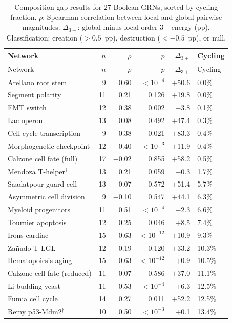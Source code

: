 \documentclass[10pt]{article}
\begin{document}
\begin{longtable}{lrrrrl}
\caption{Composition gap results for 27 Boolean GRNs, sorted by
cycling fraction. $\rho$: Spearman correlation between local and
global pairwise magnitudes. $\Delta_{3+}$: global minus local
order-3+ energy (pp). Classification: creation ($> 0.5$~pp),
destruction ($< -0.5$~pp), or null.}
\label{tab:all_results} \\
\toprule
Network & $n$ & $\rho$ & $p$ & $\Delta_{3+}$ & Cycling \\
\midrule
\endfirsthead
\toprule
Network & $n$ & $\rho$ & $p$ & $\Delta_{3+}$ & Cycling \\
\midrule
\endhead
\bottomrule
\endfoot
Arellano root stem & 9 & 0.60 & $< 10^{-4}$ & $+$50.6 & 0.0\% \\
Segment polarity & 11 & 0.21 & 0.126 & $+$19.8 & 0.0\% \\
EMT switch & 12 & 0.38 & 0.002 & $-$3.8 & 0.1\% \\
Lac operon & 13 & 0.08 & 0.492 & $+$47.4 & 0.3\% \\
Cell cycle transcription & 9 & $-$0.38 & 0.021 & $+$83.3 & 0.4\% \\
Morphogenetic checkpoint & 12 & 0.40 & $< 10^{-3}$ & $+$11.9 & 0.4\% \\
Calzone cell fate (full) & 17 & $-$0.02 & 0.855 & $+$58.2 & 0.5\% \\
Mendoza T-helper$^\dagger$ & 13 & 0.21 & 0.059 & $-$0.3 & 1.7\% \\
Saadatpour guard cell & 13 & 0.07 & 0.572 & $+$51.4 & 5.7\% \\
Asymmetric cell division & 9 & $-$0.10 & 0.547 & $+$44.1 & 6.3\% \\
Myeloid progenitors & 11 & 0.51 & $< 10^{-4}$ & $-$2.3 & 6.6\% \\
Tournier apoptosis & 12 & 0.25 & 0.046 & $+$8.5 & 7.4\% \\
Irons cardiac & 15 & 0.63 & $< 10^{-12}$ & $+$10.9 & 9.3\% \\
Za\~nudo T-LGL & 12 & $-$0.19 & 0.120 & $+$33.2 & 10.3\% \\
Hematopoiesis aging & 15 & 0.63 & $< 10^{-12}$ & $+$0.9 & 10.5\% \\
Calzone cell fate (reduced) & 11 & $-$0.07 & 0.586 & $+$37.0 & 11.1\% \\
Li budding yeast & 11 & 0.53 & $< 10^{-4}$ & $+$6.3 & 12.5\% \\
Fumia cell cycle & 14 & 0.27 & 0.011 & $+$52.2 & 12.5\% \\
Remy p53-Mdm2$^\dagger$ & 10 & 0.50 & $< 10^{-3}$ & $+$0.1 & 13.4\% \\

\end{longtable}
\end{document}
